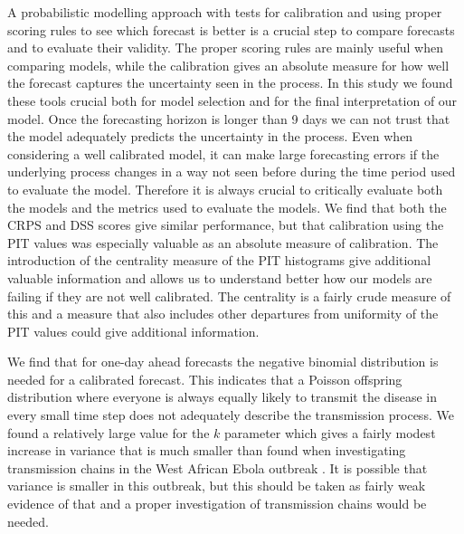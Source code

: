 \documentclass[12pt]{article}
\begin{document}
A probabilistic modelling approach with tests for calibration and using proper scoring rules to see which forecast is better is a crucial step to compare forecasts and to evaluate their validity. The proper scoring rules are mainly useful when comparing models, while the calibration gives an absolute measure for how well the forecast captures the uncertainty seen in the process. In this study we found these tools crucial both for model selection and for the final interpretation of our model. Once the forecasting horizon is longer than 9 days we can not trust that the model adequately predicts the uncertainty in the process. Even when considering a well calibrated model, it can make large forecasting errors if the underlying process changes in a way not seen before during the time period used to evaluate the model. Therefore it is always crucial to critically evaluate both the models and the metrics used to evaluate the models. We find that both the CRPS and DSS scores give similar performance, but that calibration using the PIT values was especially valuable as an absolute measure of calibration. The introduction of the centrality measure of the PIT histograms give additional valuable information and allows us to understand better how our models are failing if they are not well calibrated. The centrality is a fairly crude measure of this and a measure that also includes other departures from uniformity of the PIT values could give additional information. 

We find that for one-day ahead forecasts the negative binomial distribution is needed for a calibrated forecast. This indicates that a Poisson offspring distribution where everyone is always equally likely to transmit the disease in every small time step does not adequately describe the transmission process. We found a relatively large value for the $k$ parameter which gives a fairly modest increase in variance that is much smaller than found when investigating transmission chains in the West African Ebola outbreak \cite{internationalebolaresponseteamExposurePatternsDriving2016}. It is possible that variance is smaller in this outbreak, but this should be taken as fairly weak evidence of that and a proper investigation of transmission chains would be needed. 
\end{document}
